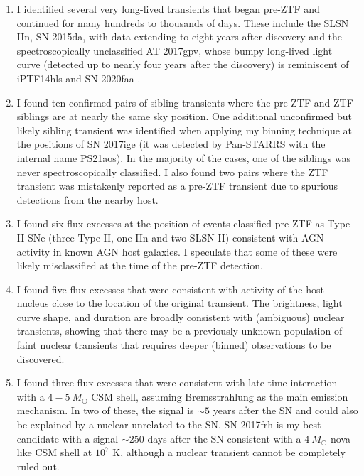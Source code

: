 \documentclass[a4paper,oneside,12pt, class=Latex/Classes/PhDthesisPSnPDF, crop=false]{standalone}
\begin{document}
\begin{enumerate}
    \item I identified several very long-lived transients that began pre-ZTF and continued for many hundreds to thousands of days. These include the SLSN IIn, SN 2015da, with data extending to eight years after discovery and the spectroscopically unclassified AT 2017gpv, whose bumpy long-lived light curve (detected up to nearly four years after the discovery) is reminiscent of iPTF14hls \citep{iPTF14hls_Iair, Sollerman_2019_iptf14hls} and SN 2020faa \citep{Yang_2021_20faa, 2020faa_hidden_shocks}. 
    \item I found ten confirmed pairs of sibling transients where the pre-ZTF and ZTF siblings are at nearly the same sky position. One additional unconfirmed but likely sibling transient was identified when applying my binning technique at the positions of SN 2017ige (it was detected by Pan-STARRS with the internal name PS21aos). In the majority of the cases, one of the siblings was never spectroscopically classified. I also found two pairs where the ZTF transient was mistakenly reported as a pre-ZTF transient due to spurious detections from the nearby host.
    \item I found six flux excesses at the position of events classified pre-ZTF as Type II SNe (three Type II, one IIn and two SLSN-II) consistent with AGN activity in known AGN host galaxies. I speculate that some of these were likely misclassified at the time of the pre-ZTF detection.
    \item I found five flux excesses that were consistent with activity of the host nucleus close to the location of the original transient. The brightness, light curve shape, and duration are broadly consistent with (ambiguous) nuclear transients, showing that there may be a previously unknown population of faint nuclear transients that requires deeper (binned) observations to be discovered.
    \item I found three flux excesses that were consistent with late-time interaction with a $4 - 5\ M_\odot$ CSM shell, assuming Bremsstrahlung as the main emission mechanism. In two of these, the signal is $\sim5$ years after the SN and could also be explained by a nuclear unrelated to the SN. SN 2017frh is my best candidate with a signal $\sim250$ days after the SN consistent with a $4\ M_\odot$ nova-like CSM shell at $10^7$ K, although a nuclear transient cannot be completely ruled out.
 \end{enumerate}
\end{document}
